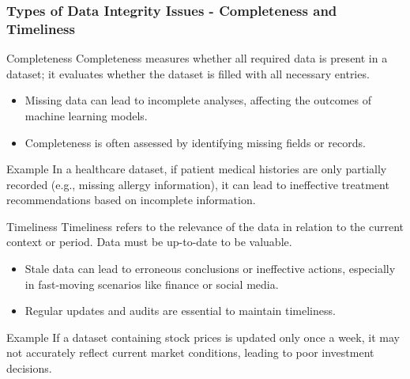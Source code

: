 \documentclass{beamer}
\begin{document}
\begin{frame}[fragile]
    \frametitle{Types of Data Integrity Issues - Completeness and Timeliness}
    
    \begin{block}{Completeness}
        Completeness measures whether all required data is present in a dataset; it evaluates whether the dataset is filled with all necessary entries.
        \begin{itemize}
            \item Missing data can lead to incomplete analyses, affecting the outcomes of machine learning models.
            \item Completeness is often assessed by identifying missing fields or records.
        \end{itemize}
        \begin{block}{Example}
            In a healthcare dataset, if patient medical histories are only partially recorded (e.g., missing allergy information), it can lead to ineffective treatment recommendations based on incomplete information.
        \end{block}
    \end{block}
    
    \begin{block}{Timeliness}
        Timeliness refers to the relevance of the data in relation to the current context or period. Data must be up-to-date to be valuable.
        \begin{itemize}
            \item Stale data can lead to erroneous conclusions or ineffective actions, especially in fast-moving scenarios like finance or social media.
            \item Regular updates and audits are essential to maintain timeliness.
        \end{itemize}
        \begin{block}{Example}
            If a dataset containing stock prices is updated only once a week, it may not accurately reflect current market conditions, leading to poor investment decisions.
        \end{block}
    \end{block}
\end{frame}
\end{document}
